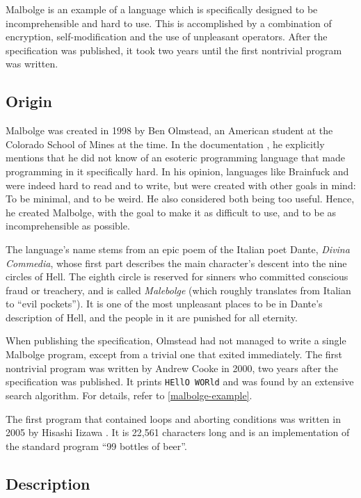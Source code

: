 Malbolge is an example of a language which is specifically designed to be incomprehensible and hard to use. This is accomplished by a combination of encryption, self-modification and the use of unpleasant operators. After the specification was published, it took two years until the first nontrivial program was written.

\subsection{Origin}

Malbolge was created in 1998 by Ben Olmstead, an American student at the Colorado School of Mines at the time. In the documentation \cite{olmstead1998malbolge}, he explicitly mentions that he did not know of an esoteric programming language that made programming in it specifically hard. In his opinion, languages like Brainfuck and \ic{} were indeed hard to read and to write, but were created with other goals in mind: To be minimal, and to be weird. He also considered both being too useful. Hence, he created Malbolge, with the goal to make it as difficult to use, and to be as incomprehensible as possible.

The language's name stems from an epic poem of the Italian poet Dante, \emph{Divina Commedia}, whose first part describes the main character's descent into the nine circles of Hell. The eighth circle is reserved for sinners who committed conscious fraud or treachery, and is called \emph{Malebolge} (which roughly translates from Italian to “evil pockets”). It is one of the most unpleasant places to be in Dante's description of Hell, and the people in it are punished for all eternity.

When publishing the specification, Olmstead had not managed to write a single Malbolge program, except from a trivial one that exited immediately. The first nontrivial program was written by Andrew Cooke in 2000, two years after the specification was published. It prints \texttt{HEllO WORld} \cite{cooke2000malbolge} and was found by an extensive search algorithm. For details, refer to \cref{malbolge-example}.

The first program that contained loops and aborting conditions was written in 2005 by Hisashi Iizawa \cite{iizawa2005malbolge}. It is 22,561 characters long and is an implementation of the standard program “99 bottles of beer”.

\subsection{Description}

